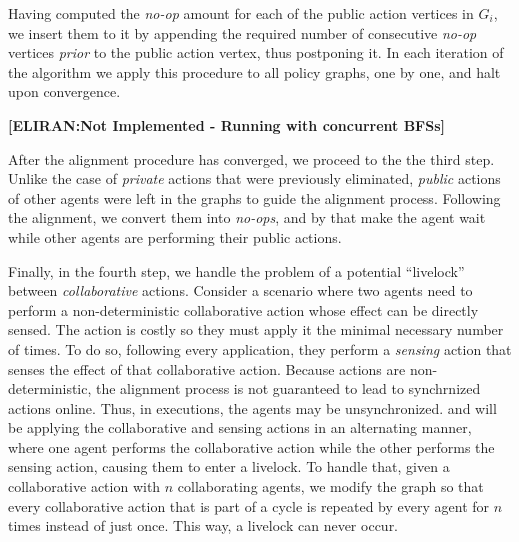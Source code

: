\documentclass[letterpaper]{article} %
\theoremstyle{definition}
\newcommand{\eliran}[1]{\textbf{[\color{red}ELIRAN:#1]}}
\newcommand{\guy}[1]{\textbf{[\color{orange}GUY:#1]}}
\begin{document}
{Having computed the  {\em no-op} amount for each of the public action vertices in $G_i$, we insert them to it by appending the required number of consecutive {\em no-op} vertices \emph{prior} to the public action vertex, thus postponing it.
In each iteration of the algorithm we apply this procedure to all policy graphs, one by one, and halt upon convergence.

\eliran{Not Implemented - Running with concurrent BFSs}

After the alignment procedure has converged, we proceed to the the third step. Unlike the case of \emph{private} actions that were previously eliminated, \emph{public} actions of other agents were left in the graphs to guide the alignment process. Following the alignment, we convert them into \emph{no-ops}, and by that make the agent wait while other agents are performing their public actions.

Finally, in the fourth step, we handle the problem of a potential ``livelock''
between \emph{collaborative} actions. Consider a scenario where two agents need to perform a non-deterministic collaborative action whose effect can be directly sensed. The action is costly so they must apply it the minimal necessary number of times. To do so, following every application, they perform a \emph{sensing} action that senses the effect of that collaborative action.
Because actions are non-deterministic, the alignment process is
not guaranteed to lead to synchrnized actions online.
Thus, in 
executions, the agents may be unsynchronized. 
and will be applying the collaborative and sensing actions in an alternating manner, where one agent performs the collaborative action while the other performs the sensing action, causing them to enter a livelock. To handle that, given a collaborative action with $n$ collaborating agents, we modify the graph so that every collaborative action that is part of a cycle is repeated by every agent for $n$ times instead of just once. This way, a livelock can never occur.
}

\end{document}
